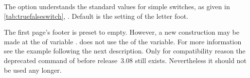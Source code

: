The option understands the standard values for simple switches, as given in
\autoref{tab:truefalseswitch}, . Default is
the setting of the letter foot.
\EndIndexGroup


\begin{Declaration}
\end{Declaration}%
%
%
The first page's footer is preset to
empty. However, a new construction may be
made at the  of variable . \KOMAScript{}
does not use the  of the variable. For more information see
the example following the next description. Only for compatibility reason the
deprecated command  of
 before release~3.08 still exists. Nevertheless it should not
be used any longer.

